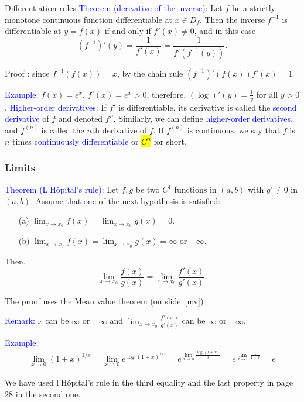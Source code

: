\documentclass[11pt,aspectratio=169]{beamer}
\begin{document}
\begin{frame}{Differentiation rules}
\textcolor{blue}{Theorem (derivative of the inverse):} Let $f$ be a strictly monotone continuous function  differentiable at $x \in D_f$. Then the inverse $f^{-1}$ is differentiable at $y=f(x)$ if and only if $f'(x) \neq 0$, and in this case
$$
(f^{-1})'(y)=\frac{1}{f'(x)}=\frac{1}{f'(f^{-1}(y))}.
$$
\begin{tiny} Proof : since $f^{-1}(f(x))=x$, by the chain rule $(f^{-1})'(f(x))f'(x)=1$ \end{tiny}
\vskip 11pt
\textcolor{blue}{Example:}  $f(x)=e^x$, $f'(x)=e^x > 0$, therefore, $(\log)'(y)=\frac{1}{y}$ for all $y>0$.
\vskip 11pt
\textcolor{blue}{Higher-order derivatives:} If $f'$ is differentiable,  its derivative is called the \textcolor{blue}{second derivative} of $f$ and  denoted $f''$. Similarly, we can define \textcolor{blue}{higher-order derivatives}, and $f^{(n)}$ is called the $n$th derivative of $f$. If $f^{(n)}$ is continuous, we say that $f$ is $n$ times \textcolor{blue}{continuously differentiable} or \hl{$C^{n}$} for short.


\end{frame}

\begin{frame}
\frametitle{Limits}
 \textcolor{blue}{Theorem (L'H\^opital's rule):} Let $f,g$ be  two $C^1$ functions in $(a,b)$ with $g' \neq 0$
in $(a,b)$. Assume that one of the next hypothesis is satisfied:
\begin{itemize}
\item[(a)] $\lim_{x \rightarrow x_0} f(x)=\lim_{x \rightarrow x_0} g(x)=0$.
\item[(b)] $\lim_{x \rightarrow x_0} f(x)=\lim_{x \rightarrow x_0} g(x)=\infty$ or $-\infty$.
\end{itemize}
Then,
$$
\lim_{x \rightarrow x_0} \frac{f(x)}{g(x)}=\lim_{x \rightarrow x_0} \frac{f'(x)}{g'(x)}.
$$
\begin{tiny} The proof uses the Mean value theorem (on slide~\ref{mv}) \end{tiny}

\begin{tiny}\textcolor{blue}{Remark:} $x$ can be $\infty$ or $-\infty$ and $\lim_{x \rightarrow x_0} \frac{f'(x)}{g'(x)}$
can be $\infty$ or $-\infty$.\end{tiny}
\vskip 12pt
\textcolor{blue}{Example:} 
\begin{equation*}
\begin{split}
\lim_{x \rightarrow 0} (1+x)^{1/x}=\lim_{x \rightarrow 0} e^{\log (1+x)^{1/x}}=
e^{\lim_{x \rightarrow 0} \frac{\log (1+x)}{x}}=e^{\lim_{x \rightarrow 0} \frac{1}{1+x}}=e
\end{split}
\end{equation*}
\begin{tiny}We have used l'H\^opital's rule in the third equality and the last property in page 28 in the second one.\end{tiny}


\end{frame}
\end{document}
